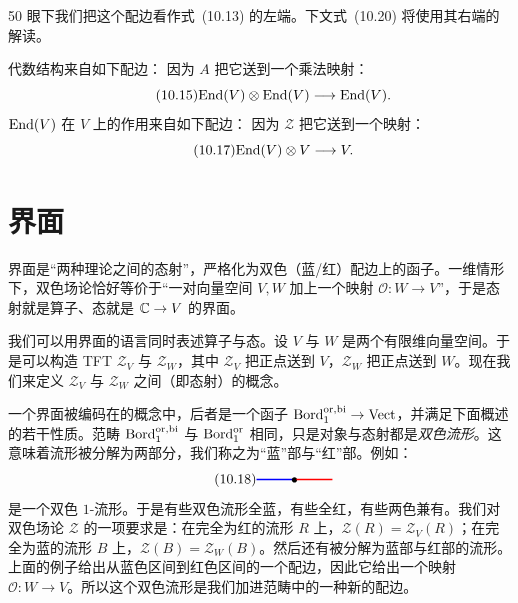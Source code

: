 \begin{srcrem}{50}
眼下我们把这个配边看作式~(10.13) 的左端。下文式~(10.20) 将使用其右端的解读。
\end{srcrem}

代数结构来自如下配边：
因为 $A$ 把它送到一个乘法映射：
\begin{equation}\tag{10.15}
\mathrm{End}(V)\otimes\mathrm{End}(V)\longrightarrow \mathrm{End}(V).
\end{equation}
$\mathrm{End}(V)$ 在 $V$ 上的作用来自如下配边：
因为 $\mathcal{Z}$ 把它送到一个映射：
\begin{equation}\tag{10.17}
\mathrm{End}(V)\otimes V\longrightarrow V.
\end{equation}


\section{界面}\label{sec:10-3}

\begin{sectionkey}
界面是“两种理论之间的态射”，严格化为双色（蓝/红）配边上的函子。一维情形下，双色场论恰好等价于“一对向量空间 $V,W$ 加上一个映射 $\mathcal{O}\colon W\to V$”，于是态射就是算子、态就是 $\mathbb{C}\to V$ 的界面。
\end{sectionkey}

我们可以用界面的语言同时表述算子与态。设 $V$ 与 $W$ 是两个有限维向量空间。于是可以构造 TFT $\mathcal{Z}_V$ 与 $\mathcal{Z}_W$，其中 $\mathcal{Z}_V$ 把正点送到 $V$，$\mathcal{Z}_W$ 把正点送到 $W$。现在我们来定义 $\mathcal{Z}_V$ 与 $\mathcal{Z}_W$ 之间（即态射）的概念。

一个界面被编码在的概念中，后者是一个函子 $\mathrm{Bord}_1^{\mathrm{or,bi}}\to\mathrm{Vect}$，并满足下面概述的若干性质。范畴 $\mathrm{Bord}_1^{\mathrm{or,bi}}$ 与 $\mathrm{Bord}_1^{\mathrm{or}}$ 相同，只是对象与态射都是\emph{双色流形}。这意味着流形被分解为两部分，我们称之为“蓝”部与“红”部。例如：
\begin{equation}\tag{10.18}
\textcolor{blue}{\rule[0.55ex]{2.6em}{1.1pt}}\!\!\bullet\!\!\textcolor{red}{\rule[0.55ex]{2.6em}{1.1pt}}
\end{equation}
是一个双色 $1$-流形。于是有些双色流形全蓝，有些全红，有些两色兼有。我们对双色场论 $\mathcal{Z}$ 的一项要求是：在完全为红的流形 $R$ 上，$\mathcal{Z}(R)=\mathcal{Z}_V(R)$；在完全为蓝的流形 $B$ 上，$\mathcal{Z}(B)=\mathcal{Z}_W(B)$。然后还有被分解为蓝部与红部的流形。上面的例子给出从蓝色区间到红色区间的一个配边，因此它给出一个映射 $\mathcal{O}\colon W\to V$。所以这个双色流形是我们加进范畴中的一种新的配边。

